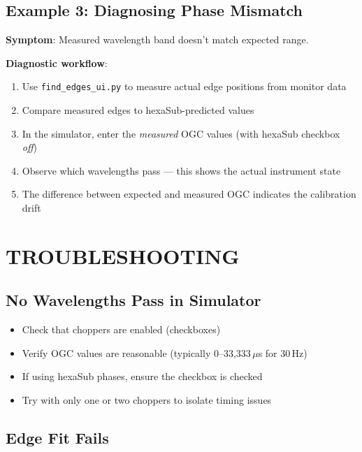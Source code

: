 \documentclass[tm]{ornltm}
\begin{document}
\subsection{Example 3: Diagnosing Phase Mismatch}

\textbf{Symptom}: Measured wavelength band doesn't match expected range.

\textbf{Diagnostic workflow}:
\begin{enumerate}
    \item Use \texttt{find\_edges\_ui.py} to measure actual edge positions from monitor data
    \item Compare measured edges to hexaSub-predicted values
    \item In the simulator, enter the \emph{measured} OGC values (with hexaSub checkbox \emph{off})
    \item Observe which wavelengths pass --- this shows the actual instrument state
    \item The difference between expected and measured OGC indicates the calibration drift
\end{enumerate}

\section{TROUBLESHOOTING}

\subsection{No Wavelengths Pass in Simulator}

\begin{itemize}
    \item Check that choppers are enabled (checkboxes)
    \item Verify OGC values are reasonable (typically 0--33,333\,$\mu$s for 30\,Hz)
    \item If using hexaSub phases, ensure the checkbox is checked
    \item Try with only one or two choppers to isolate timing issues
\end{itemize}

\subsection{Edge Fit Fails}
\end{document}
